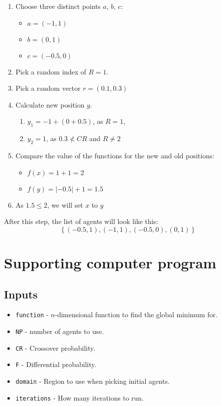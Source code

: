 \documentclass[a4paper,12pt]{article}
\begin{document}
\begin{enumerate}
  \item Choose three distinct points $a$, $b$, $c$:
    \begin{itemize}
      \item $a = (-1, 1)$
      \item $b = (0, 1)$
      \item $c = (-0.5, 0)$
    \end{itemize}
  \item Pick a random index of $R = 1$.
  \item Pick a random vector $r = (0.1, 0.3)$
  \item Calculate new position $y$.
    \begin{enumerate}
      \item $y_1 = -1 + (0 + 0.5)$, as $R = 1$,
      \item $y_2 = 1$, as $0.3 \not < CR$ and $R \not = 2$
    \end{enumerate}
  \item Compare the value of the functions for the new and old positions:
    \begin{itemize}
      \item $f(x) = 1 + 1 = 2$
      \item $f(y) = |-0.5| + 1 = 1.5$
    \end{itemize}
  \item As $1.5 \leq 2$, we will set $x$ to $y$
\end{enumerate}

After this step, the list of agents will look like this:
\[
\left\{ (-0.5, 1), (-1, 1), (-0.5, 0), (0, 1) \right\}
\]

\section*{Supporting computer program}

\subsection*{Inputs}

\begin{itemize}
  \item \texttt{function} - $n$-dimensional function to find the global minimum for.
  \item \texttt{NP} - number of agents to use.
  \item \texttt{CR} - Crossover probability.
  \item \texttt{F} - Differential probability.
  \item \texttt{domain} - Region to use when picking initial agents.
  \item \texttt{iterations} - How many iterations to run.
\end{itemize}
\end{document}
